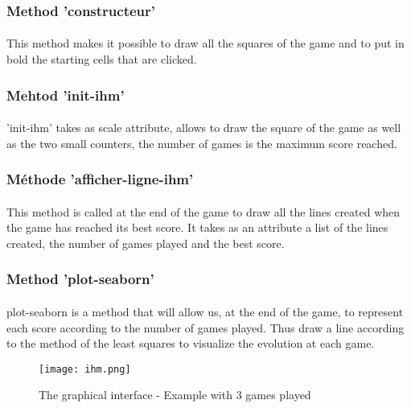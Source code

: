 \documentclass{article}
\begin{document}
\subsubsection{Method 'constructeur'}
\paragraph{}
\setlength{\parindent}{2cm}
This method makes it possible to draw all the squares of the game and to put in bold the starting cells that are clicked. 
\subsubsection{Mehtod 'init-ihm'}
\paragraph{}
\setlength{\parindent}{2cm}
'init-ihm' takes as scale attribute, allows to draw the square of the game as well as the two small counters, the number of games is the maximum score reached.
\subsubsection{Méthode 'afficher-ligne-ihm'}
\paragraph{}
\setlength{\parindent}{2cm}
 This method is called at the end of the game to draw all the lines created when the game has reached its best score. It takes as an attribute a list of the lines created, the number of games played and the best score.
\subsubsection{Method 'plot-seaborn'}
\paragraph{}
\setlength{\parindent}{2cm}
plot-seaborn is a method that will allow us, at the end of the game, to represent each score according to the number of games played. Thus draw a line according to the method of the least squares to visualize the evolution at each game. 
\newline
\begin{figure}[!h]
\texttt{[image: ihm.png]}
\\%
\caption{The graphical interface - Example with 3 games played}
\end{figure}
\end{document}
